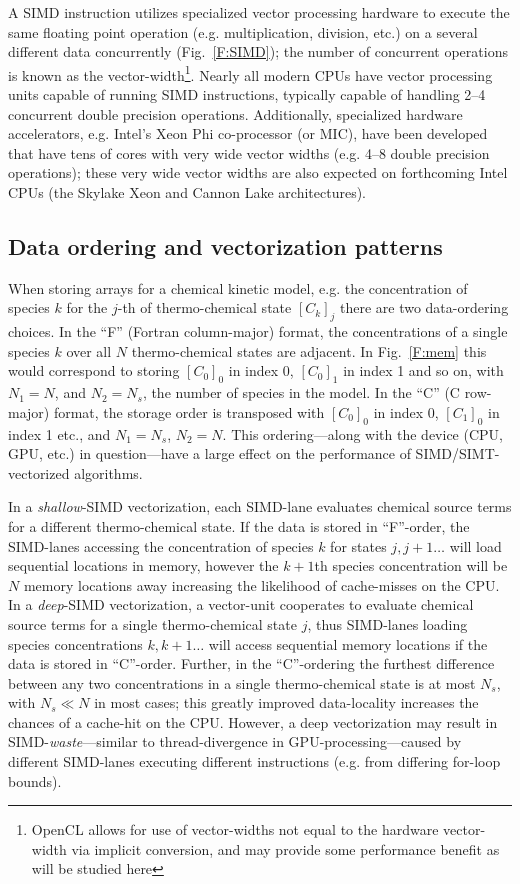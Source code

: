 \documentclass[12pt]{ussci}
\begin{document}
A SIMD instruction utilizes specialized vector processing hardware to execute the same floating point operation (e.g. multiplication, division, etc.) on a several different data concurrently (Fig.~\ref{F:SIMD}); the number of concurrent operations is known as the vector-width\footnote{OpenCL allows for use of vector-widths not equal to the hardware vector-width via implicit conversion, and may provide some performance benefit as will be studied here}.
Nearly all modern CPUs have vector processing units capable of running SIMD instructions, typically capable of handling 2--4 concurrent double precision operations.
Additionally, specialized hardware accelerators, e.g. Intel's Xeon Phi co-processor (or MIC), have been developed that have tens of cores with very wide vector widths (e.g. 4--8 double precision operations); these very wide vector widths are also expected on forthcoming Intel CPUs (the Skylake Xeon and Cannon Lake architectures).

\subsection{Data ordering and vectorization patterns}
\label{S:data}
When storing arrays for a chemical kinetic model, e.g. the concentration of species $k$ for the $j$-th of thermo-chemical state $[C_k]_j$ there are two data-ordering choices.
In the ``F'' (Fortran column-major) format, the concentrations of a single species $k$ over all $N$ thermo-chemical states are adjacent.
In Fig.~\ref{F:mem} this would correspond to storing $[C_0]_0$ in index \num{0}, $[C_0]_1$ in index \num{1} and so on, with $N_1 = N$, and $N_2 = N_s$, the number of species in the model.
In the ``C'' (C row-major) format, the storage order is transposed with $[C_0]_0$ in index \num{0}, $[C_1]_0$ in index \num{1} etc., and $N_1 = N_s$, $N_2 = N$.
This ordering---along with the device (CPU, GPU, etc.) in question---have a large effect on the performance of SIMD\slash SIMT-vectorized algorithms.

In a \textit{shallow}-SIMD vectorization, each SIMD-lane evaluates chemical source terms for a different thermo-chemical state.
If the data is stored in ``F''-order, the SIMD-lanes accessing the concentration of species $k$ for states $j, j+1\ldots$ will load sequential locations in memory, however the $k+1$th species concentration will be $N$ memory locations away increasing the likelihood of cache-misses on the CPU.
In a \textit{deep}-SIMD vectorization, a vector-unit cooperates to evaluate chemical source terms for a single thermo-chemical state $j$, thus SIMD-lanes loading species concentrations $k, k+1\ldots$ will access sequential memory locations if the data is stored in ``C''-order.
Further, in the ``C''-ordering the furthest difference between any two concentrations in a single thermo-chemical state is at most $N_s$, with $N_s \ll N$ in most cases; this greatly improved data-locality increases the chances of a cache-hit on the CPU.
However, a deep vectorization may result in SIMD-\textit{waste}---similar to thread-divergence in GPU-processing---caused by different SIMD-lanes executing different instructions (e.g. from differing for-loop bounds).
\end{document}
